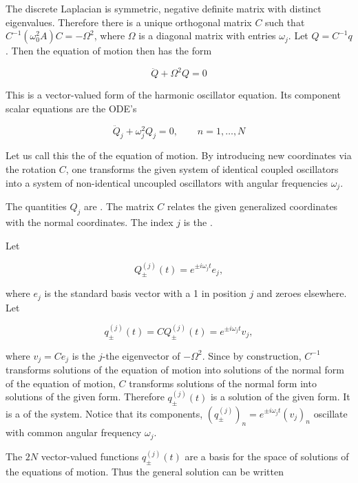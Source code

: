 The discrete Laplacian is symmetric, negative definite matrix with distinct eigenvalues. Therefore there is a unique orthogonal matrix $C$ such that $C^{-1}(\omega_0^2A)C = -\Omega^2$, where $\Omega$ is a diagonal matrix with entries $\omega_j$.  Let $Q = C^{-1}q$. Then the equation of motion then has the form

\begin{equation}
\ddot Q + \Omega^2 Q = 0
\end{equation}

This is a vector-valued form of the harmonic oscillator equation.  Its component scalar equations are the ODE's

\begin{equation}
\ddot Q_j + \omega_j^2 Q_j = 0, \qquad n = 1, \ldots, N
\end{equation}

Let us call this the  of the equation of motion.
By introducing new coordinates via the rotation $C$, one transforms the given system of identical coupled oscillators into a system of non-identical uncoupled oscillators with angular frequencies $\omega_j$. 

The quantities $Q_j$ are .  The matrix $C$ relates the given generalized coordinates with the normal coordinates.  The index $j$ is the .

Let

\begin{equation}
Q^{(j)}_\pm(t) = e^{\pm i \omega_j t} e_j,
\end{equation}

where $e_j$ is the standard basis vector with a 1 in position $j$ and zeroes elsewhere.  Let

\begin{equation}
q^{(j)}_\pm(t) =  CQ^{(j)}_\pm(t) =  e^{\pm i\omega_j t} v_j,
\end{equation}

where $v_j = Ce_j$ is the $j$-the eigenvector of $-\Omega^2$.
Since by construction, $C^{-1}$ transforms solutions of the equation of motion into solutions of the normal form of the  equation of motion, $C$ transforms solutions of the normal form into solutions of the given form.  Therefore $q^{(j)}_\pm(t)$ is a solution of the given form.  It is a  of the system.  Notice that its components, 
$(q_\pm^{(j)})_n = e^{\pm i\omega_j t} (v_j)_n$ oscillate with common angular frequency $\omega_j$.

The $2N$ vector-valued functions $q^{(j)}_\pm(t)$ are a basis for the space of solutions of the equations of motion.  Thus the general solution can be written

